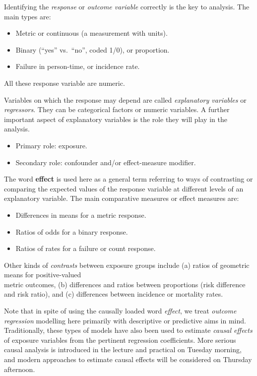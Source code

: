 \documentclass[
]{book}
\providecommand{\tightlist}{%
  \setlength{\itemsep}{0pt}\setlength{\parskip}{0pt}}
\begin{document}
Identifying the \emph{response} or \emph{outcome variable} correctly is the key
to analysis. The main types are:

\begin{itemize}
\tightlist
\item
  Metric or continuous (a measurement with units).
\item
  Binary (``yes'' vs.~``no'', coded 1/0), or proportion.
\item
  Failure in person-time, or incidence rate.
\end{itemize}

All these response variable are numeric.

Variables on which the response may depend are called \emph{explanatory
variables} or \emph{regressors}. They can be categorical factors or numeric variables.
A further important aspect of explanatory variables is the role they will play in the analysis.

\begin{itemize}
\tightlist
\item
  Primary role: exposure.
\item
  Secondary role: confounder and/or effect-measure modifier.
\end{itemize}

The word \textbf{effect}
is used here as a general term referring to ways of
contrasting or comparing the expected values of the response variable at
different levels of an explanatory
variable. The main comparative measures or effect measures are:

\begin{itemize}
\tightlist
\item
  Differences in means for a metric response.
\item
  Ratios of odds for a binary response.
\item
  Ratios of rates for a failure or count response.
\end{itemize}

Other kinds of \emph{contrasts} between exposure groups
include (a) ratios of geometric means for positive-valued\\
metric outcomes,
(b) differences and ratios between proportions
(risk difference and risk ratio), and (c)
differences between incidence or mortality rates.

Note that in spite of using the causally loaded word \emph{effect},
we treat \emph{outcome regression} modelling
here primarily with descriptive or predictive aims in mind.
Traditionally, these types of models have also been used
to estimate \emph{causal effects} of exposure variables
from the pertinent regression coefficients.
More serious causal analysis is introduced in the lecture and practical
on Tuesday morning, and modern approaches
to estimate causal effects will be considered
on Thursday afternoon.
\end{document}
